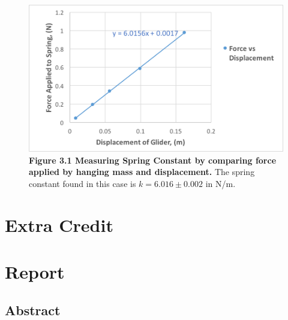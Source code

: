 \documentclass[11pt]{report}
\begin{document}
\begin{figure}[h!]
    \includegraphics[width=\linewidth]{SpringForce.png}
    \captionsetup{labelformat=empty}
    \caption{\textbf{Figure 3.1 Measuring Spring Constant by comparing force
    applied by hanging mass and displacement.} The spring constant found in this
case is \(k = 6.016 \pm 0.002\) in N/m.}
\end{figure}

\section*{Extra Credit}

\section*{Report}
\subsection*{Abstract}
\end{document}
